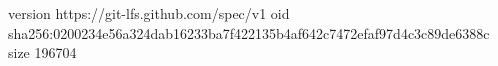 version https://git-lfs.github.com/spec/v1
oid sha256:0200234e56a324dab16233ba7f422135b4af642c7472efaf97d4c3c89de6388c
size 196704
